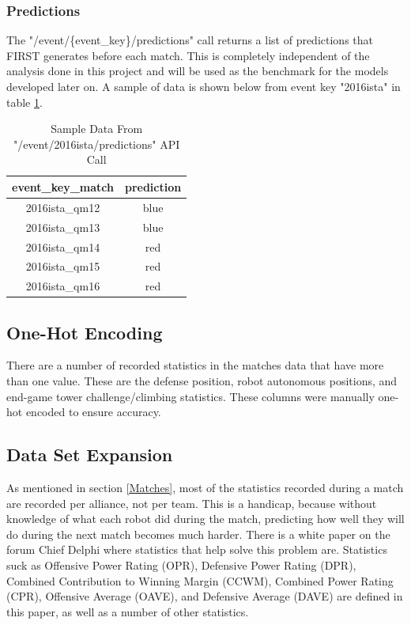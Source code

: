 \documentclass{article}
\begin{document}
\subsubsection{Predictions} \label{Predictions}
\par
The "/event/\{event\_key\}/predictions" call returns a list of predictions that FIRST generates before each match. This is completely independent of the analysis done in this project and will be used as the benchmark for the models developed later on. A sample of data is shown below from event key "2016ista" in table \ref{table:4}.

\begin{table}[H]
\caption{Sample Data From "/event/2016ista/predictions" API Call}
\centering
\begin{tabular} { |c|c| }
\hline
event\_key\_match & prediction \\
\hline
2016ista\_qm12 & blue \\
\hline
2016ista\_qm13 & blue \\
\hline
2016ista\_qm14 & red \\
\hline
2016ista\_qm15 & red \\
\hline
2016ista\_qm16 & red \\
\hline
\end{tabular}
\label{table:4}
\end{table}

\subsection{One-Hot Encoding}
\par
There are a number of recorded statistics in the matches data that have more than one value. These are the defense position, robot autonomous positions, and end-game tower challenge/climbing statistics. These columns were manually one-hot encoded to ensure accuracy.

\subsection{Data Set Expansion}
\par
As mentioned in section \ref{Matches}, most of the statistics recorded during a match are recorded per alliance, not per team. This is a handicap, because without knowledge of what each robot did during the match, predicting how well they will do during the next match becomes much harder. There is a white paper \citep{statspaper} on the forum Chief Delphi where statistics that help solve this problem are. Statistics suck as Offensive Power Rating (OPR), Defensive Power Rating (DPR), Combined Contribution to Winning Margin (CCWM), Combined Power Rating (CPR), Offensive Average (OAVE), and Defensive Average (DAVE) are defined in this paper, as well as a number of other statistics.
\end{document}
